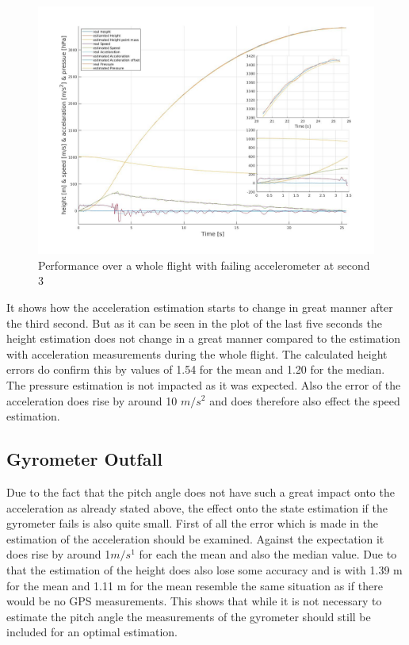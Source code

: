 \begin{figure}[h!]
 \centering
 \includegraphics[width=.8\textwidth]{./Pictures/BestSystemPerformanceAccOutfall.jpg}
 \caption{Performance over a whole flight with failing accelerometer at second 3}
 \label{fig:PerformanceAccOutfall}
\end{figure}

It shows how the acceleration estimation starts to change in great manner after the third second.
But as it can be seen in the plot of the last five seconds the height estimation does not change in a great manner
compared to the estimation with acceleration measurements during the whole flight.
The calculated height errors do confirm this by values of 1.54 for the mean and 1.20 for the median.
The pressure estimation is not impacted as it was expected.
Also the error of the acceleration does rise by around 10 $m/s^2$ and does therefore also effect the speed estimation.

\subsection{Gyrometer Outfall}
Due to the fact that the pitch angle does not have such a great impact onto the acceleration as already stated above,
the effect onto the state estimation if the gyrometer fails is also quite small.
First of all the error which is made in the estimation of the acceleration should be examined.
Against the expectation it does rise by around 1$m/s^1$ for each the mean and also the median value.
Due to that the estimation of the height does also lose some accuracy and is with 1.39 m for the mean
and 1.11 m for the mean resemble the same situation as if there would be no GPS measurements.
This shows that while it is not necessary to estimate the pitch angle the measurements of the gyrometer should still be included for an optimal estimation.

